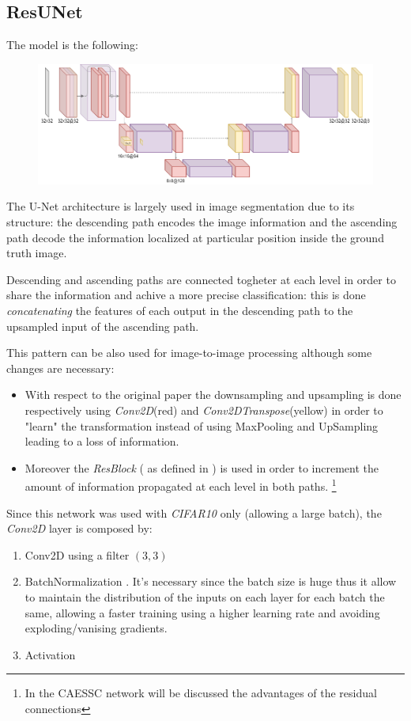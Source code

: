 \subsection{ResUNet}
The model is the following:
\begin{figure}[H]
    \centering
    \includegraphics[scale=0.3]{subsections/resunet/resunet.png}
\end{figure}


The U-Net \cite{unet} architecture is largely used in image segmentation due to its structure: the descending path encodes the image information and the ascending path decode the information localized at particular position inside the ground truth image.

Descending and ascending paths are connected togheter at each level in order to share the information and achive a more precise classification: this is done \textit{concatenating} the features of each output in the descending path to the upsampled input of the ascending path.  

This pattern can be also used for image-to-image processing although some changes are necessary:
\begin{itemize}
    \item With respect to the original paper the downsampling and upsampling is done respectively using \textit{Conv2D}(red) and \textit{Conv2DTranspose}(yellow) in order to "learn" the transformation instead of using MaxPooling and UpSampling leading to a loss of information.
    \item Moreover the \textit{ResBlock} ( as defined in \cite{resnet} ) is used in order to increment the amount of information propagated at each level in both paths. \footnote{In the CAESSC network will be discussed the advantages of the residual connections}
\end{itemize}

Since this network was used with \textit{CIFAR10} only (allowing a large batch), the \textit{Conv2D} layer is composed by:
\begin{enumerate}
    \item Conv2D using a filter $(3,3)$
    \item BatchNormalization \cite{BN}. It's necessary since the batch size is huge thus it allow to maintain the distribution of the inputs on each layer for each batch the same, allowing a faster training using a higher learning rate and avoiding exploding/vanising gradients.
    \item Activation
\end{enumerate}

